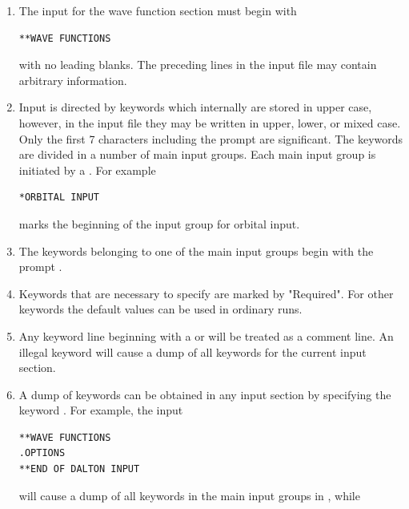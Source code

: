 \begin{enumerate}
\item {The input for the wave function section must begin with

\begin{inputex} \begin{verbatim}
**WAVE FUNCTIONS
\end{verbatim} \end{inputex}
   with no leading blanks.  The preceding lines in the input file may
   contain arbitrary information.
}

\item{Input is directed by keywords which internally are stored
   in upper case, however, in the input file they may be written in upper, lower, or mixed case.
   Only the first 7 characters including the prompt are significant.
   The keywords are divided in a number of main input groups. Each main
   input group is initiated by a {\starkey}. For example

\begin{inputex} \begin{verbatim}
*ORBITAL INPUT
\end{verbatim} \end{inputex}
   marks the beginning of the input group for orbital input.
}

\item {The keywords belonging to one of the main input groups begin with
   the prompt {\dotkey}.
}

\item {Keywords that are necessary to specify are marked by "Required".
   For other keywords the default values can be used in ordinary runs.
}

\item {Any keyword line beginning with a \quotekw{!} or
   \quotekw{\#} will be treated as a
   comment line.  An illegal keyword will cause a dump of all keywords
   for the current input section.
}

\item{A dump of keywords can be obtained in any input section by
specifying the keyword .  For example, the input

\begin{inputex} \begin{verbatim}
**WAVE FUNCTIONS
.OPTIONS
**END OF DALTON INPUT
\end{verbatim} \end{inputex}

   will cause a dump  of all keywords in the main input groups in {\sir}, while

}
\end{enumerate}
